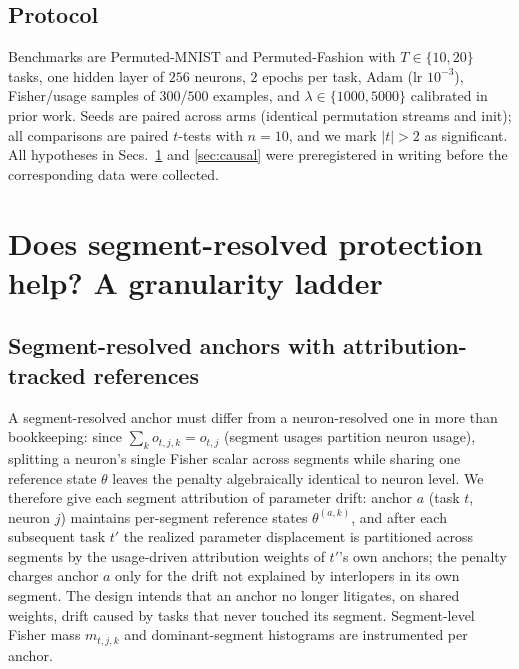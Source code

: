 \documentclass[review,12pt,number]{elsarticle}
\begin{document}
\subsection{Protocol}
\label{sec:protocol}

\label{sec:protocol}

Benchmarks are Permuted-MNIST and Permuted-Fashion \cite{parisi2019,xiao2017} with
$T\in\{10,20\}$ tasks, one hidden layer of $256$ neurons, $2$ epochs per
task, Adam (lr $10^{-3}$), Fisher/usage samples of $300$/$500$ examples, and
$\lambda \in \{1000, 5000\}$ calibrated in prior work. Seeds are paired
across arms (identical permutation streams and init); all comparisons are
paired $t$-tests with $n{=}10$, and we mark $|t|>2$ as significant. All
hypotheses in Secs.~\ref{sec:granularity} and \ref{sec:causal} were
preregistered in writing before the corresponding data were collected.






\section{Does segment-resolved protection help? A granularity ladder}
\label{sec:granularity}

\subsection{Segment-resolved anchors with attribution-tracked references}
\label{sec:branchdesign}

A segment-resolved anchor must differ from a neuron-resolved one in more
than bookkeeping: since $\sum_k o_{t,j,k} = o_{t,j}$ (segment usages
partition neuron usage), splitting a neuron's single Fisher scalar across
segments while sharing one reference state $\theta$ leaves the penalty
algebraically identical to neuron level. We therefore give each segment
attribution of parameter drift: anchor $a$ (task $t$, neuron $j$) maintains
per-segment reference states $\theta^{(a,k)}$, and after each subsequent
task $t'$ the realized parameter displacement is partitioned across segments
by the usage-driven attribution weights of $t'$'s own anchors; the penalty
charges anchor $a$ only for the drift not explained by interlopers in its
own segment. The design intends that an anchor no longer litigates, on
shared weights, drift caused by tasks that never touched its segment.
Segment-level Fisher mass $m_{t,j,k}$ and dominant-segment histograms are
instrumented per anchor.
\end{document}
